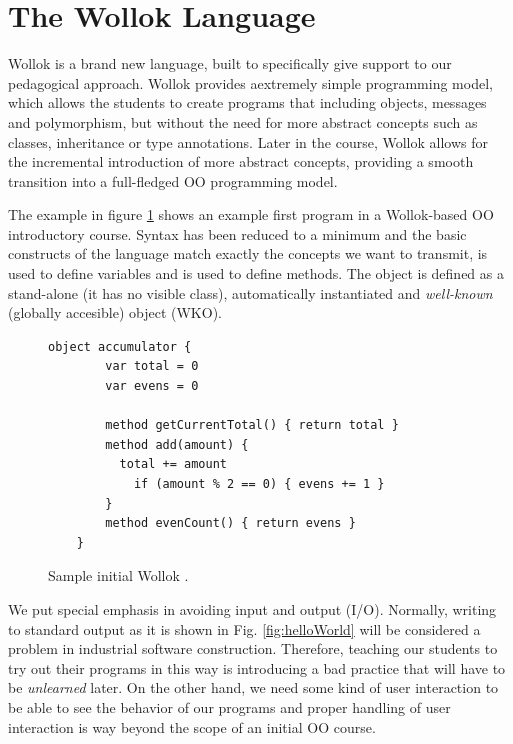 \section{The Wollok Language}
\label{sec:wollokLanguage}


Wollok is a brand new language, built to specifically give support to our pedagogical approach. 
Wollok provides aextremely simple programming model, which allows the students to create programs that including objects, messages and polymorphism, but without the need for more abstract concepts such as classes, inheritance or type annotations.
Later in the course, Wollok allows for the incremental introduction of more abstract concepts,
providing a smooth transition into a full-fledged OO programming model.

The example in figure \ref{fig:helloWorld/wollok} shows an example first program in a Wollok-based OO introductory course.
Syntax has been reduced to a minimum and the basic constructs of the language match exactly the concepts we want to transmit, \eg {} is used to define variables and  is used to define methods.
The  object is defined as a stand-alone (\ie it has no visible class), automatically instantiated and \emph{well-known} (\ie globally accesible) object (WKO).

\begin{figure}[ht]
 \centering
 \begin{lstlisting}[language=Wollok]
	object accumulator {
		var total = 0
		var evens = 0
		
		method getCurrentTotal() { return total }
		method add(amount) { 
		  total += amount 
			if (amount % 2 == 0) { evens += 1 }
		}
		method evenCount() { return evens }
	}
 \end{lstlisting}
 
 \caption{\small Sample initial Wollok . 
}
 \label{fig:helloWorld/wollok}
\end{figure}

\medskip 

We put special emphasis in avoiding input and output (I/O). 
Normally, writing to standard output as it is shown in Fig. \ref{fig:helloWorld} will be considered a problem in industrial software construction.
Therefore, teaching our students to try out their programs in this way is introducing a bad practice that will have to be \emph{unlearned} later.
On the other hand, we need some kind of user interaction to be able to see the behavior of our programs and proper handling of user interaction is way beyond the scope of an initial OO course.

